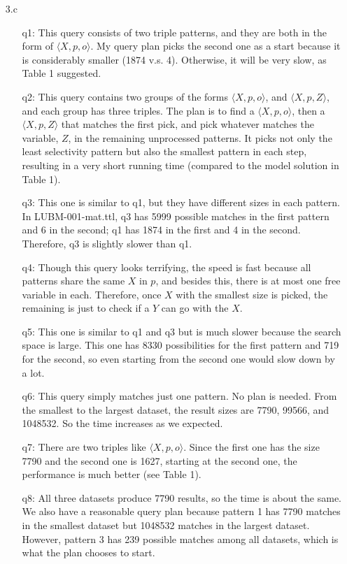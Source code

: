 \documentclass{article}
\begin{document}
\begin{enumerate}
\item[3.c]
\begin{enumerate}
\item[q1:] This query consists of two triple patterns, and they are both in the form of $\langle X, p, o\rangle$. My query plan picks the second one as a start because it is considerably smaller (1874 v.s. 4). Otherwise, it will be very slow, as Table 1 suggested. 

\item[q2:] This query contains two groups of the forms $\langle X, p, o\rangle$, and $\langle X, p, Z\rangle$, and each group has three triples. The plan is to find a $\langle X, p, o\rangle$, then a $\langle X, p, Z\rangle$ that matches the first pick, and pick whatever matches the variable, $Z$, in the remaining unprocessed patterns. It picks not only the least selectivity pattern but also the smallest pattern in each step, resulting in a very short running time (compared to the model solution in Table 1). 
\item[q3:] This one is similar to q1, but they have different sizes in each pattern. In LUBM-001-mat.ttl, q3 has 5999 possible matches in the first pattern and 6 in the second; q1 has 1874 in the first and 4 in the second. Therefore, q3 is slightly slower than q1. 
\item[q4:] Though this query looks terrifying, the speed is fast because all patterns share the same $X$ in $p$, and besides this, there is at most one free variable in each. Therefore, once $X$ with the smallest size is picked, the remaining is just to check if a $Y$ can go with the $X$. 
\item[q5:] This one is similar to q1 and q3 but is much slower because the search space is large. This one has 8330 possibilities for the first pattern and  719 for the second, so even starting from the second one would slow down by a lot. 
\item[q6:] This query simply matches just one pattern. No plan is needed. From the smallest to the largest dataset, the result sizes are 7790, 99566, and 1048532. So the time increases as we expected.
\item[q7:] There are two triples like $\langle X, p, o\rangle$. Since the first one has the size 7790 and the second one is 1627, starting at the second one, the performance is much better (see Table 1). 
\item[q8:] All three datasets produce 7790 results, so the time is about the same. We also have a reasonable query plan because pattern 1 has 7790 matches in the smallest dataset but 1048532 matches in the largest dataset. However, pattern 3 has 239 possible matches among all datasets, which is what the plan chooses to start. 

\end{enumerate}
\end{enumerate}
\end{document}
